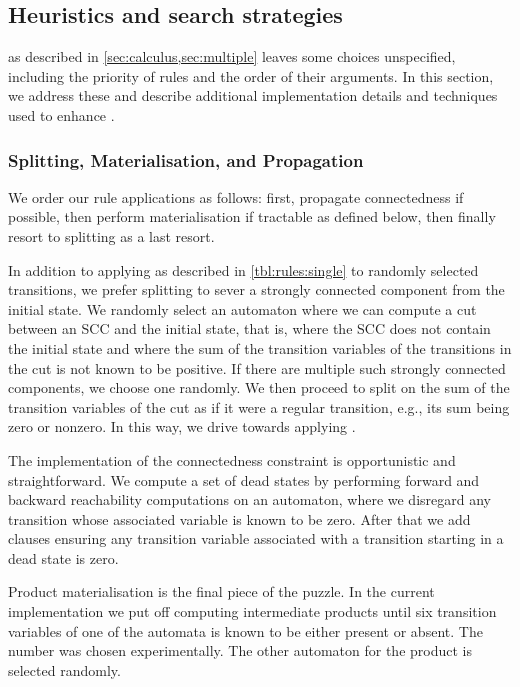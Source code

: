 \subsection{Heuristics and search strategies}

\Calculus{} as described in \cref{sec:calculus,sec:multiple} leaves some choices
unspecified, including the priority of rules and the order of their arguments. In
this section, we address these and describe additional implementation details
and techniques used to enhance \Catra{}.

\subsubsection{Splitting, Materialisation, and Propagation}

We order our rule applications as follows: first, propagate connectedness if
possible, then perform materialisation if tractable as defined below, then
finally resort to splitting as a last resort.

In addition to applying \Split{} as described in \cref{tbl:rules:single} to
randomly selected transitions, we prefer splitting to sever a strongly connected
component from the initial state. We randomly select an automaton where we can
compute a cut between an SCC and the initial state, that is, where the SCC does
not contain the initial state and where the sum of the transition variables of
the transitions in the cut is not known to be positive. If there are multiple
such strongly connected components, we choose one randomly. We then proceed to
split on the sum of the transition variables of the cut as if it were a regular
transition, e.g., its sum being zero or nonzero. In this way, we drive \Calculus{}
towards applying \Propagate{}.

The implementation of the connectedness constraint is opportunistic and
straightforward. We compute a set of dead states by performing forward and
backward reachability computations on an automaton, where we disregard any
transition whose associated variable is known to be zero. After that we add
clauses ensuring any transition variable associated with a transition starting
in a dead state is zero.

Product materialisation is the final piece of the puzzle. In the current
implementation we put off computing intermediate products until six transition
variables of one of the automata is known to be either present or absent. The
number was chosen experimentally. The other automaton for the product is
selected randomly.

